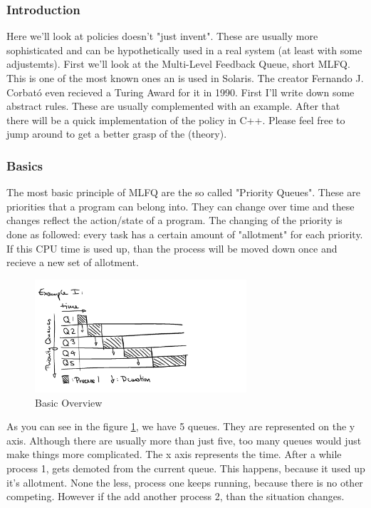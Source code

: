 \documentclass{report}
\begin{document}
\subsubsection{Introduction}
Here we'll look at policies doesn't "just invent".
These are usually more sophisticated and can be hypothetically used in a real system (at least with some adjustemts). 
First we'll look at the Multi-Level Feedback Queue, short MLFQ. 
This is one of the most known ones an is used in Solaris.
The creator Fernando J. Corbató even recieved a Turing Award for it in 1990.
First I'll write down some abstract rules. These are usually complemented with an example. 
After that there will be a quick implementation of the policy in C++.
Please feel free to jump around to get a better grasp of the (theory).

\subsubsection{Basics}

The most basic principle of MLFQ are the so called "Priority Queues". These are priorities that a program can belong into.
They can change over time and these changes reflect the action/state of a program.
The changing of the priority is done as followed: every task has a certain amount of "allotment" for each priority.
If this CPU time is used up, than the process will be moved down once and recieve a new set of allotment.

\begin{figure}[h]
  \begin{center}
    \includegraphics[width=0.7\textwidth]{assets/mlfq-diag-1.png}
    \caption{Basic Overview}
    \label{mlfq-diag-1}
  \end{center}
\end{figure}

As you can see in the figure \ref{mlfq-diag-1}, we have 5 queues. They are represented on the y axis. 
Although there are usually more than just five, too many queues would just make things more complicated. 
The x axis represents the time.
After a while process 1, gets demoted from the current queue. This happens, because it used up it's allotment.
None the less, process one keeps running, because there is no other competing. 
However if the add another process 2, than the situation changes.
\end{document}
